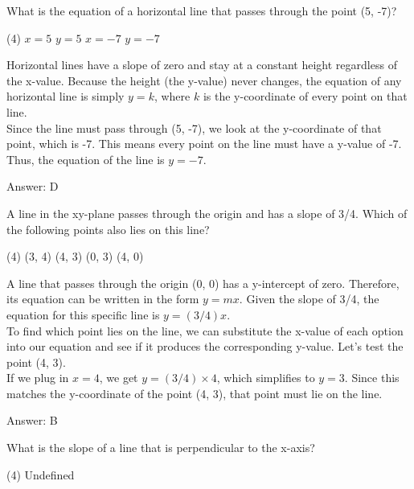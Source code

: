 \documentclass[11pt,paper=a4,answers]{exam}
\begin{document}
\begin{questions}
\question
What is the equation of a horizontal line that passes through the point (5, -7)?
\begin{tasks}(4)
    \task $x = 5$
    \task $y = 5$
    \task $x = -7$
    \task $y = -7$
\end{tasks}

\begin{solution}
Horizontal lines have a slope of zero and stay at a constant height regardless of the x-value. Because the height (the y-value) never changes, the equation of any horizontal line is simply $y = k$, where $k$ is the y-coordinate of every point on that line.
\\[10pt]
Since the line must pass through (5, -7), we look at the y-coordinate of that point, which is -7. This means every point on the line must have a y-value of -7. Thus, the equation of the line is $y = -7$.

\vspace{15pt}
Answer: \colorbox{yellow!100}{D}
\end{solution}

\question
A line in the xy-plane passes through the origin and has a slope of 3/4. Which of the following points also lies on this line?
\begin{tasks}(4)
    \task (3, 4)
    \task (4, 3)
    \task (0, 3)
    \task (4, 0)
\end{tasks}

\begin{solution}
A line that passes through the origin (0, 0) has a y-intercept of zero. Therefore, its equation can be written in the form $y = mx$. Given the slope of 3/4, the equation for this specific line is $y = (3/4)x$.
\\[10pt]
To find which point lies on the line, we can substitute the x-value of each option into our equation and see if it produces the corresponding y-value. Let's test the point (4, 3).
\\[10pt]
If we plug in $x = 4$, we get $y = (3/4) \times 4$, which simplifies to $y = 3$. Since this matches the y-coordinate of the point (4, 3), that point must lie on the line.

\vspace{15pt}
Answer: \colorbox{yellow!100}{B}
\end{solution}

\question
What is the slope of a line that is perpendicular to the x-axis?
\begin{tasks}(4)
    \task Undefined
\end{tasks}


\end{questions}
\end{document}
